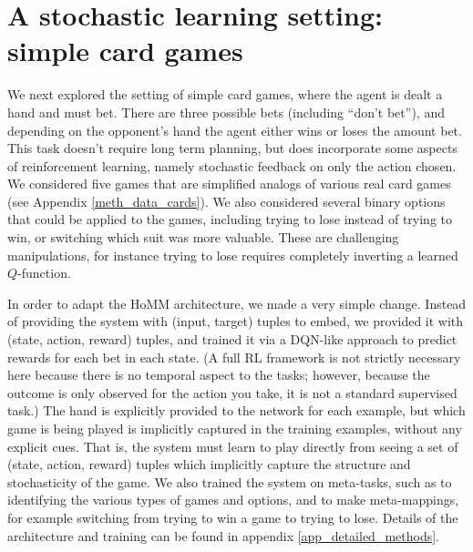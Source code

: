 \documentclass{article}
\begin{document}
\section{A stochastic learning setting: simple card games}\label{sec_cards}
\vspace{-0.5em} %
We next explored the setting of simple card games, where the agent is dealt a hand and must bet. There are three possible bets (including ``don't bet''), and depending on the opponent's hand the agent either wins or loses the amount bet. This task doesn't require long term planning, but does incorporate some aspects of reinforcement learning, namely stochastic feedback on only the action chosen. We considered five games that are simplified analogs of various real card games (see Appendix \ref{meth_data_cards}). We also considered several binary options that could be applied to the games, including trying to lose instead of trying to win, or switching which suit was more valuable. These are challenging manipulations, for instance trying to lose requires completely inverting a learned $Q$-function. \par
In order to adapt the HoMM architecture, we made a very simple change. Instead of providing the system with (input, target) tuples to embed, we provided it with (state, action, reward) tuples, and trained it via a DQN-like approach \citep{Mnih2015} to predict rewards for each bet in each state. (A full RL framework is not strictly necessary here because there is no temporal aspect to the tasks; however, because the outcome is only observed for the action you take, it is not a standard supervised task.) The hand is explicitly provided to the network for each example, but which game is being played is implicitly captured in the training examples, without any explicit cues. That is, the system must learn to play directly from seeing a set of (state, action, reward) tuples which implicitly capture the structure and stochasticity of the game. We also trained the system on meta-tasks, such as to identifying the various types of games and options, and to make meta-mappings, for example switching from trying to win a game to trying to lose. Details of the architecture and training can be found in appendix \ref{app_detailed_methods}. \par
\vspace{-0.7em}
\end{document}
